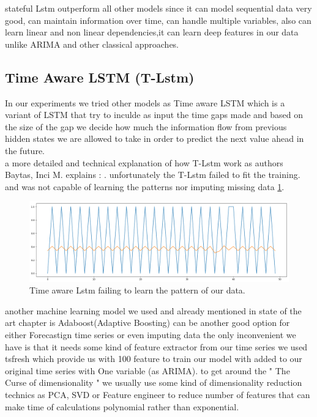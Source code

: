 stateful Lstm outperform all other models since it can model sequential data very good, can maintain information over time, can handle multiple variables, also can learn linear and non linear dependencies,it can  learn deep features in our data unlike ARIMA and other classical approaches.

\subsection{Time Aware LSTM (T-Lstm) }
In our experiments we tried other models as Time aware LSTM \cite{timeaware} which is a variant of  LSTM that try to inculde as input the time gaps made and based on the size of the gap we decide how  much the information flow from previous hidden states we are allowed to take in order to predict the next value ahead in the future.\\a more detailed and technical explanation of how T-Lstm work as authors  Baytas, Inci M.\cite{timeaware} explains : .
unfortunately the T-Lstm failed to fit the training. and was not capable of learning the patterns nor imputing missing data \ref{fig:tlstm}.
\begin{figure}[H]
\centering
\includegraphics[scale=.4]{img/T_lstm.png}  
\caption{Time aware Lstm failing to learn the pattern of our data.}
\label{fig:tlstm}
\end{figure}

another machine learning model we used and already mentioned in state of the art chapter is Adaboost(Adaptive Boosting) can be another good option for either Forecastign time series or even imputing data the only inconvenient we have is that it needs some kind of feature extractor from our time series we used tsfresh\cite{} which provide us with 100 feature to train our model with added to our original time series with One variable (as ARIMA).
to get around the " The Curse of dimensionality " we usually use some kind of dimensionality  reduction technics as PCA, SVD or Feature engineer to reduce number of features that can make time of calculations polynomial rather than exponential.

